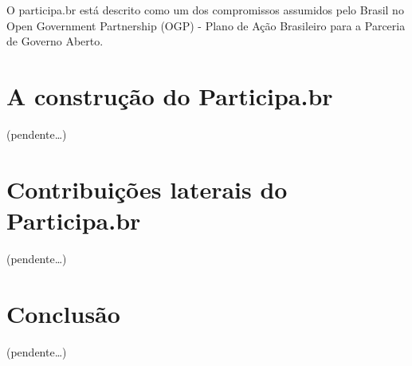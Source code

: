 \documentclass{article}
\begin{document}
O participa.br está descrito como um dos compromissos assumidos pelo Brasil no
Open Government Partnership (OGP) - Plano de Ação Brasileiro para a Parceria de
Governo Aberto.

\section{A construção do Participa.br}

(pendente\ldots)

%
%


\section{Contribuições laterais do Participa.br}

(pendente\ldots)


\section{Conclusão}

(pendente\ldots)



\appendix
\end{document}

